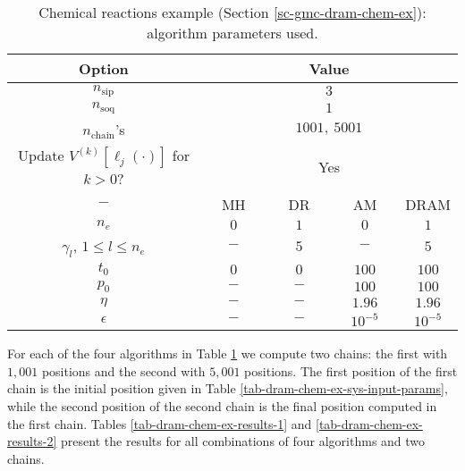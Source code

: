 \begin{table}[h!]
\begin{center}
\begin{tabular}{|c|c|c|c|c|}
\hline
Option                                            & \multicolumn{4}{c|}{Value}                                   \\
\hline
\hline
$n_{\text{sip}}$                                  & \multicolumn{4}{c|}{$3$}                                     \\
\hline
$n_{\text{soq}}$                                  & \multicolumn{4}{c|}{$1$}                                     \\
\hline
$n_{\text{chain}}$'s                              & \multicolumn{4}{c|}{$1001,~5001$}                            \\
\hline
Update $V^{(k)}[\ell_j(\cdot)]$ for $k>0$?        & \multicolumn{4}{c|}{Yes}                                     \\
\hline
\hline
$-$                                               & ~~MH~~            & ~~DR~~       & ~~AM~~       & DRAM       \\
\hline
$n_e$                                             & $0$               & $1$          & $0$          & $1$        \\
\hline
$\gamma_l$,
$1\leqslant l\leqslant n_e$                       & $-$               & $5$          & $-$          & $5$        \\
\hline
\hline
$t_0$                                             & $0$               & $0$          & $100$        & $100$      \\
\hline
$p_0$                                             & $-$               & $-$          & $100$        & $100$      \\
\hline
$\eta$                                            & $-$               & $-$          & $1.96$       & $1.96$     \\
\hline
$\epsilon$                                        & $-$               & $-$          & $10^{-5}$    & $10^{-5}$  \\
\hline
\end{tabular}
\caption{Chemical reactions example (Section \ref{sc-gmc-dram-chem-ex}):
algorithm parameters used.
}
\label{tab-dram-chem-ex-alg-params}
\end{center}
\end{table}

For each of the four algorithms in Table \ref{tab-dram-chem-ex-alg-params}
we compute two chains: the first with $1,001$ positions and the second with $5,001$ positions.
The first position of the first chain is the initial position given in Table \ref{tab-dram-chem-ex-sys-input-params}, while
the second position of the second chain is the final position computed in the first chain.
Tables \ref{tab-dram-chem-ex-results-1} and \ref{tab-dram-chem-ex-results-2} present the results for all combinations of four
algorithms and two chains.


